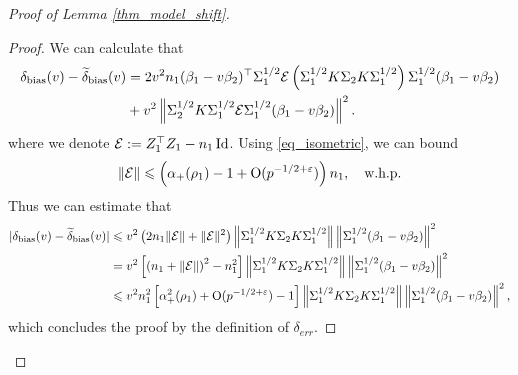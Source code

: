 \begin{proof}[Proof of Lemma \ref{thm_model_shift}]
\begin{proof}
We can calculate that
	\begin{align}
		 \delta_{\text{bias}}(v)-\widetilde\delta_{\text{bias}}(v)&= {2v^2n_1}(\beta_1 - v\beta_2)^{\top}\Sigma_1^{1/2} \mathcal{E}\left(\Sigma_1^{1/2}K \Sigma_2 K \Sigma_1^{1/2}\right) \Sigma_1^{1/2} (\beta_1 - v\beta_2) \nonumber
		\\
		&+ v^2\left\| \Sigma_2^{1/2} K \Sigma_1^{1/2}\mathcal{E} \Sigma_1^{1/2}(\beta_1 - v\beta_2) \right\|^2. \label{eq_lem_model_shift_1}
	\end{align}
	where we denote $\mathcal{E}: = Z_1^{\top}Z_1 - {n_1}\operatorname{Id}$. 
  Using \eqref{eq_isometric}, we can bound  
	$$\|\mathcal E\|\leqslant \left( \alpha_+(\rho_1)-1 + \operatorname{O}(p^{-1/2+{\varepsilon}})\right)n_1, \quad \text{w.h.p.}$$
	Thus we can estimate that 
	\begin{align*}
	| \delta_{\text{bias}}(v)-\widetilde\delta_{\text{bias}}(v)|&\leqslant v^2 \left( 2n_1  \|\mathcal E\| +  \|\mathcal E\|^2 \right) \left\| \Sigma_1^{1/2} K \Sigma_2 K \Sigma_1^{1/2} \right\| \left\| \Sigma_1^{1/2} (\beta_1 - v\beta_2) \right\|^2 \\
	&=  v^2 \left[\left( n_1 + \|\mathcal E\|\right)^2 -n_1^2 \right] \left\| \Sigma_1^{1/2} K \Sigma_2 K \Sigma_1^{1/2} \right\| \left\| \Sigma_1^{1/2} (\beta_1 - v\beta_2) \right\|^2 \\
	& \leqslant v^2 n_1^2 \left[ \alpha_+^2(\rho_1) + \operatorname{O}(p^{-1/2+{\varepsilon}}) -1\right]\left\| \Sigma_1^{1/2} K \Sigma_2 K \Sigma_1^{1/2} \right\| \left\| \Sigma_1^{1/2} (\beta_1 - v\beta_2) \right\|^2,
	\end{align*}
	which concludes the proof by the definition of $\delta_{err}$.	

\end{proof}
\end{proof}
